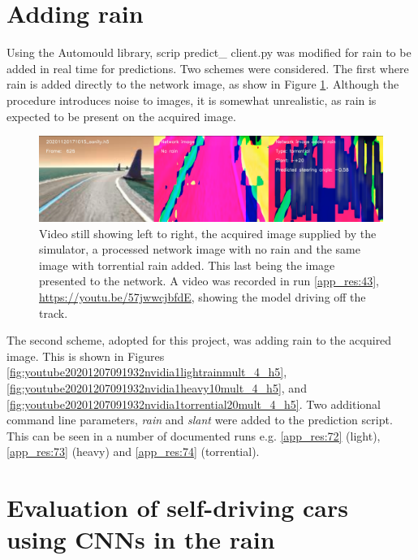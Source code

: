
\section{Adding rain}
\label{res:adding-rain-section}
Using the Automould library, scrip predict\_ client.py was modified for rain to be added in real time for predictions. Two schemes were considered. The first where rain is added directly to the network image, as show in Figure \ref{fig:tcpflow_Run43}. Although the procedure introduces noise to images, it is somewhat unrealistic, as rain is expected to be present on the acquired image.
\begin{figure}[ht]
 \centering 
 \includegraphics[width=\textwidth]{Figures/tcpflow_Run43.png}
 \caption{Video still showing left to right, the acquired image supplied by the simulator, a processed network image with no rain and the same image with torrential rain added. This last being the image presented to the network. A video was recorded in run \ref{app_res:43}, \url{https://youtu.be/57jwwcjbfdE}, showing the model driving off the track.}
 \label{fig:tcpflow_Run43} 
\end{figure}
The second scheme, adopted for this project, was adding rain to the acquired image. This is shown in Figures  \ref{fig:youtube20201207091932nvidia1lightrainmult_4_h5},
\ref{fig:youtube20201207091932nvidia1heavy10mult_4_h5}, and
 \ref{fig:youtube20201207091932nvidia1torrential20mult_4_h5}. 
Two additional command line parameters, \textit{rain} and \textit{slant} were added to the prediction script. This can be seen in a number of documented runs e.g. \ref{app_res:72} (light), \ref{app_res:73} (heavy) and \ref{app_res:74} (torrential).


\section{Evaluation of self-driving cars using CNNs in the rain}

